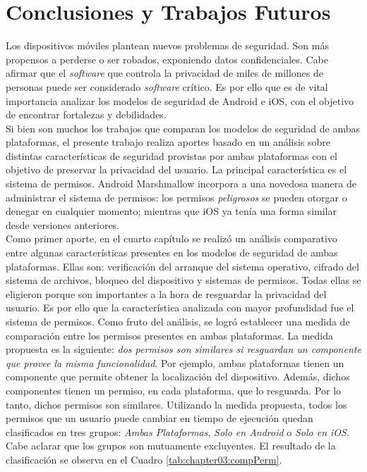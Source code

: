 \chapter{Conclusiones y Trabajos Futuros}
Los dispositivos móviles plantean nuevos problemas de seguridad. Son más propensos a perderse o ser robados, exponiendo datos confidenciales. Cabe afirmar que el \emph{software} que controla la privacidad de miles de millones de personas puede ser considerado \emph{software} crítico. Es por ello que es de vital importancia analizar los modelos de seguridad de Android e iOS, con el objetivo de encontrar fortalezas y debilidades.\\

Si bien son muchos los trabajos que comparan los modelos de seguridad de ambas plataformas, el presente trabajo realiza aportes basado en un análisis sobre distintas características de seguridad provistas por ambas plataformas con el objetivo de preservar la privacidad del usuario. La principal característica es el sistema de permisos. Android Marshmallow incorpora a una novedosa manera de administrar el sistema de permisos: los permisos \emph{peligrosos} se pueden otorgar o denegar en cualquier momento; mientras que iOS ya tenía una forma similar desde versiones anteriores.\\

Como primer aporte, en el cuarto capítulo se realizó un análisis comparativo entre algunas características presentes en los modelos de seguridad de ambas plataformas. Ellas son: verificación del arranque del sistema operativo, cifrado del sistema de archivos, bloqueo del dispositivo y sistemas de permisos. Todas ellas se eligieron porque son importantes a la hora de resguardar la privacidad del usuario. Es por ello que la característica analizada con mayor profundidad fue el sistema de permisos. Como fruto del análisis, se logró establecer una medida de comparación entre los permisos presentes en ambas plataformas. La medida propuesta es la siguiente: \emph{dos permisos son similares si resguardan un componente que provee la misma funcionalidad}. Por ejemplo, ambas plataformas tienen un componente que permite obtener la localización del dispositivo. Además, dichos componentes tienen un permiso, en cada plataforma, que lo resguarda. Por lo tanto, dichos permisos son similares. Utilizando la medida propuesta, todos los permisos que un usuario puede cambiar en tiempo de ejecución quedan clasificados en tres grupos: \emph{Ambas Plataformas}, \emph{Solo en Android} o \emph{Solo en iOS}. Cabe aclarar que los grupos son mutuamente excluyentes. El resultado de la clasificación se observa en el Cuadro \ref{tab:chapter03:compPerm}.\\ 

